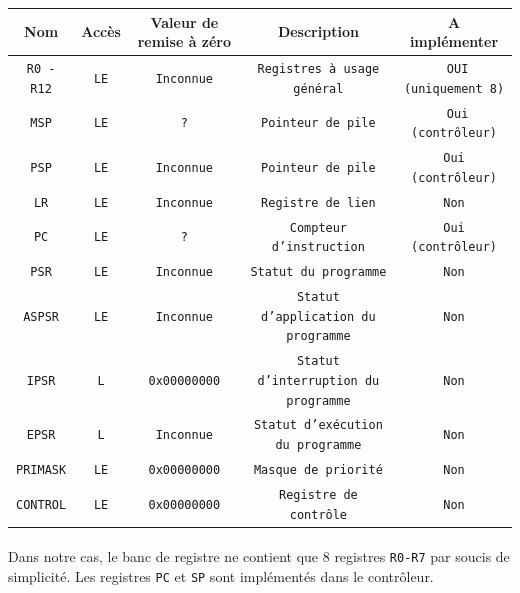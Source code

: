 \documentclass{article}
\begin{document}
    \begin{tabular}{|c|c|c|c|c|}
        \hline
        \textbf{Nom}    & \textbf{Accès} & \textbf{Valeur de remise à zéro} & \textbf{Description} & \textbf{A implémenter}\\
        \hline
        \texttt{R0 - R12} & \texttt{LE}    & \texttt{Inconnue}              & \texttt{Registres à usage général} & \texttt{ OUI (uniquement 8)}\\
        \hline
        \texttt{MSP}    & \texttt{LE}    & \texttt{?}                   & \texttt{Pointeur de pile}                   & \texttt{ Oui (contrôleur)}   \\
        \hline
        \texttt{PSP}     & \texttt{LE}    & \texttt{Inconnue}             & \texttt{Pointeur de pile}                   & \texttt{Oui (contrôleur)}    \\
        \hline
        \texttt{LR}     & \texttt{LE}    & \texttt{Inconnue}             & \texttt{Registre de lien}                   & \texttt{Non}                 \\
        \hline
        \texttt{PC}     & \texttt{LE}    & \texttt{?}                   & \texttt{Compteur d'instruction}             & \texttt{Oui (contrôleur)}    \\
        \hline
        \texttt{PSR}    & \texttt{LE}    & \texttt{Inconnue}             & \texttt{Statut du programme}                & \texttt{Non}                 \\
        \hline
        \texttt{ASPSR}  & \texttt{LE}    & \texttt{Inconnue}             & \texttt{Statut d'application du programme} & \texttt{Non}\\
        \hline
        \texttt{IPSR}   & \texttt{L}     & \texttt{0x00000000}           & \texttt{Statut d'interruption du programme} & \texttt{Non}\\
        \hline
        \texttt{EPSR}   & \texttt{L}     & \texttt{Inconnue}             & \texttt{Statut d'exécution du programme} & \texttt{Non}\\
        \hline
        \texttt{PRIMASK}  & \texttt{LE}    & \texttt{0x00000000}           & \texttt{Masque de priorité}                 & \texttt{Non}                 \\
        \hline
        \texttt{CONTROL}  & \texttt{LE}    & \texttt{0x00000000}           & \texttt{Registre de contrôle} & \texttt{Non}\\
        \hline
    \end{tabular}

    \paragraph{}
    Dans notre cas, le banc de registre ne contient que 8 registres \texttt{R0-R7} par soucis de simplicité.
    Les registres \texttt{PC} et \texttt{SP} sont implémentés dans le contrôleur.
\end{document}
